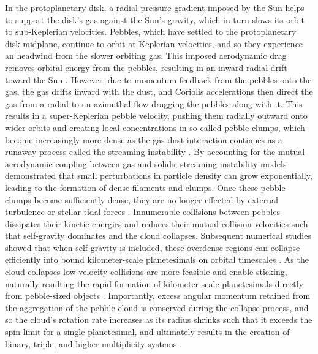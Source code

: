 \documentclass[fleqn,usenatbib]{mnras}
\begin{document}
In the protoplanetary disk, a radial pressure gradient imposed by the Sun helps to support the disk's gas against the Sun's gravity, which in turn slows its orbit to sub-Keplerian velocities. 
Pebbles, which have settled to the protoplanetary disk midplane, continue to orbit at Keplerian velocities, and so they experience an headwind from the slower orbiting gas.
This imposed aerodynamic drag removes orbital energy from the pebbles, resulting in an inward radial drift toward the Sun \citep{Whipple1972,Weidenschilling1977,Hayashi1981}.
However, due to momentum feedback from the pebbles onto the gas, the gas drifts inward with the dust, and Coriolis accelerations then direct the gas from a radial to an azimuthal flow dragging the pebbles along with it.
This results in a super-Keplerian pebble velocity, pushing them radially outward onto wider orbits and creating local concentrations in so-called pebble clumps, which become increasingly more dense as the gas-dust interaction continues as a runaway process called the streaming instability \citep[see][for a review]{Squire2020}.
By accounting for the mutual aerodynamic coupling between gas and solids, streaming instability models demonstrated that small perturbations in particle density can grow exponentially, leading to the formation of dense filaments and clumps. 
Once these pebble clumps become sufficiently dense, they are no longer effected by external turbulence or stellar tidal forces \citep{Youdin2005b,Johansen2007b}.
Innumerable collisions between pebbles dissipates their kinetic energies and reduces their mutual collision velocities such that self-gravity dominates and the cloud collapses.
Subsequent numerical studies showed that when self-gravity is included, these overdense regions can collapse efficiently into bound kilometer-scale planetesimals on orbital timescales \citep{Johansen2015}. 
As the cloud collapses low-velocity collisions are more feasible and enable sticking, naturally resulting the rapid formation of kilometer-scale planetesimals directly from pebble-sized objects \citep{Johansen2015,Simon2024}.
Importantly, excess angular momentum retained from the aggregation of the pebble cloud is conserved during the collapse process, and so the cloud's rotation rate increases as its radius shrinks such that it exceeds the spin limit for a single planetesimal, and ultimately results in the creation of binary, triple, and higher multiplicity systems \citep{Nesvorny2010,Robinson2020,Barnes2025}. 
\end{document}

